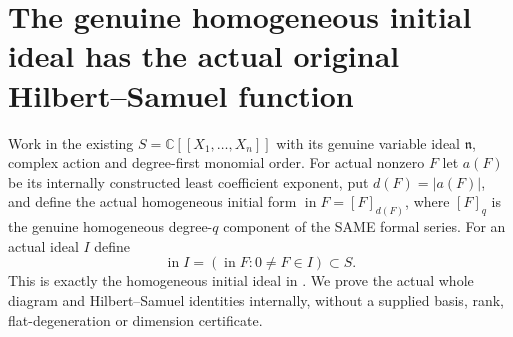 \section{The genuine homogeneous initial ideal has the actual original Hilbert--Samuel function}

Work in the existing $S=\mathbb C[[X_1,\ldots,X_n]]$ with its genuine
variable ideal $\mathfrak n$, complex action and degree-first monomial order.
For actual nonzero $F$ let $a(F)$ be its internally constructed least
coefficient exponent, put $d(F)=|a(F)|$, and define the actual homogeneous
initial form $\operatorname{in}F=[F]_{d(F)}$, where $[F]_q$ is the genuine
homogeneous degree-$q$ component of the SAME formal series.
For an actual ideal $I$ define
\[
 \operatorname{in}I=(\operatorname{in}F:0\ne F\in I)\subset S.
\]
This is exactly the homogeneous initial ideal in
\cite[\S7, Remark~7.6 and Lemma~7.7, pp.~263--264]{bierstone-milman97-invent-math}.
We prove the actual whole diagram and Hilbert--Samuel identities internally,
without a supplied basis, rank, flat-degeneration or dimension certificate.

